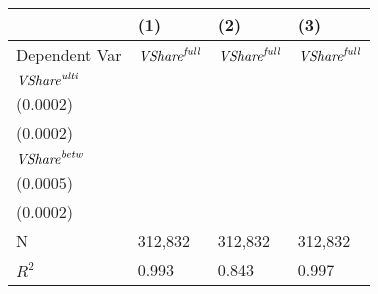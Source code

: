 \begin{tabular}{llll}
\toprule
{} &                                      (1) &                                      (2) &                                      (3) \\
\midrule
Dependent Var             &                ${\it VShare}^{\it full}$ &                ${\it VShare}^{\it full}$ &                ${\it VShare}^{\it full}$ \\
${\it VShare}^{\it ulti}$ &  \makecell{$1.0147^{***}$ \\ ($0.0002$)} &                              \makecell{} &  \makecell{$0.8882^{***}$ \\ ($0.0002$)} \\
${\it VShare}^{\it betw}$ &                              \makecell{} &  \makecell{$0.6562^{***}$ \\ ($0.0005$)} &  \makecell{$0.0995^{***}$ \\ ($0.0002$)} \\
\midrule N                &                                  312,832 &                                  312,832 &                                  312,832 \\
$R^2$                     &                                    0.993 &                                    0.843 &                                    0.997 \\
\bottomrule
\end{tabular}
